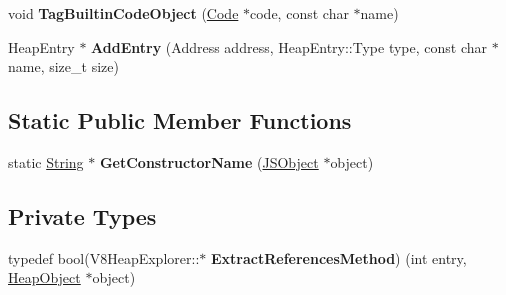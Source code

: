 \begin{DoxyCompactItemize}
\item 
void {\bfseries Tag\+Builtin\+Code\+Object} (\hyperlink{classv8_1_1internal_1_1_code}{Code} $\ast$code, const char $\ast$name)\hypertarget{classv8_1_1internal_1_1_v8_heap_explorer_ad3d4c6c7b58608611364dd2d926e335e}{}\label{classv8_1_1internal_1_1_v8_heap_explorer_ad3d4c6c7b58608611364dd2d926e335e}

\item 
Heap\+Entry $\ast$ {\bfseries Add\+Entry} (Address address, Heap\+Entry\+::\+Type type, const char $\ast$name, size\+\_\+t size)\hypertarget{classv8_1_1internal_1_1_v8_heap_explorer_abd278633cdd9c46c73e0455558f16068}{}\label{classv8_1_1internal_1_1_v8_heap_explorer_abd278633cdd9c46c73e0455558f16068}

\end{DoxyCompactItemize}
\subsection*{Static Public Member Functions}
\begin{DoxyCompactItemize}
\item 
static \hyperlink{classv8_1_1internal_1_1_string}{String} $\ast$ {\bfseries Get\+Constructor\+Name} (\hyperlink{classv8_1_1internal_1_1_j_s_object}{J\+S\+Object} $\ast$object)\hypertarget{classv8_1_1internal_1_1_v8_heap_explorer_a6d153afbe0111362b4333c3eed73d9c1}{}\label{classv8_1_1internal_1_1_v8_heap_explorer_a6d153afbe0111362b4333c3eed73d9c1}

\end{DoxyCompactItemize}
\subsection*{Private Types}
\begin{DoxyCompactItemize}
\item 
typedef bool(V8\+Heap\+Explorer\+::$\ast$ {\bfseries Extract\+References\+Method}) (int entry, \hyperlink{classv8_1_1internal_1_1_heap_object}{Heap\+Object} $\ast$object)\hypertarget{classv8_1_1internal_1_1_v8_heap_explorer_a903e9dba50d439741d58db274f3b422c}{}\label{classv8_1_1internal_1_1_v8_heap_explorer_a903e9dba50d439741d58db274f3b422c}

\end{DoxyCompactItemize}
